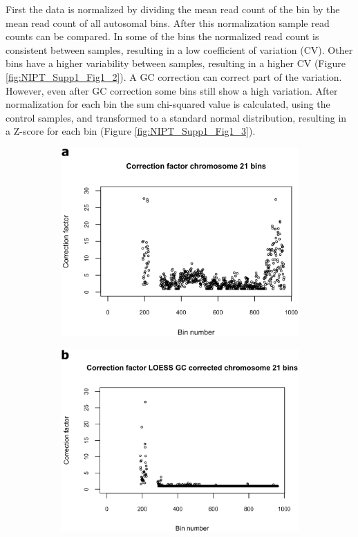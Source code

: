 First the data is normalized by dividing the mean read count of the bin by the mean read count of all autosomal bins. 
After this normalization sample read counts can be compared. 
In some of the bins the normalized read count is consistent between samples, resulting in a low coefficient of variation (CV). 
Other bins have a higher variability between samples, resulting in a higher CV (Figure \ref{fig:NIPT_Supp1_Fig1_2}).
A GC correction can correct part of the variation. However, even after GC correction some bins still show a high variation.
After normalization for each bin the sum chi-squared value is calculated, using the control samples, and transformed to a standard normal distribution, resulting in a Z-score for each bin (Figure \ref{fig:NIPT_Supp1_Fig1_3}).

\begin{figure}[h]
	\begin{subfigure}{.5\textwidth}
		\centering
		\includegraphics[width=1\linewidth]{img/NIPT_Supp1_Fig1_4a}
		\label{fig:NIPT_Supp1_Fig1_4a}
	\end{subfigure}%
	\begin{subfigure}{.5\textwidth}
		\centering
		\includegraphics[width=1\linewidth]{img/NIPT_Supp1_Fig1_4b}

\end{subfigure}
\end{figure}
